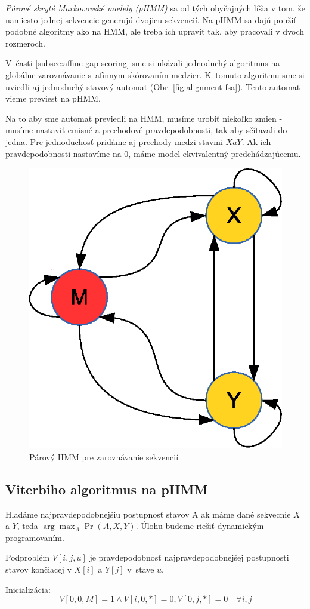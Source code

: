 \textit{Párové skryté Markovovské modely (pHMM)} sa od tých obyčajných líšia v tom, že namiesto jednej sekvencie generujú dvojicu sekvencií. Na pHMM sa dajú použiť podobné algoritmy ako na HMM, ale treba ich upraviť tak, aby pracovali v dvoch rozmeroch.

V~časti \ref{subsec:affine-gap-scoring} sme si ukázali jednoduchý algoritmus na globálne zarovnávanie s~afínnym skórovaním medzier. K~tomuto algoritmu sme si uviedli aj jednoduchý stavový automat (Obr. \ref{fig:alignment-fsa}). Tento automat vieme previesť na pHMM.

Na to aby sme automat previedli na HMM, musíme urobiť niekoľko zmien - musíme nastaviť emisné a prechodové pravdepodobnosti, tak aby sčítavali do jedna. Pre jednoduchosť pridáme aj prechody medzi stavmi $X a Y$. Ak ich pravdepodobnosti nastavíme na 0, máme model ekvivalentný predchádzajúcemu. \cite{durbin}

\begin{figure}[htp]
    \centering
    \includegraphics[width=.4\textwidth]{images/simple_model}
    \caption{Párový HMM pre zarovnávanie sekvencií}
    \label{fig:simple-model}
\end{figure}

\subsection{Viterbiho algoritmus na pHMM}
Hľadáme najpravdepodobnejšiu postupnosť stavov A ak máme dané sekvecnie $X$ a $Y$, teda $\arg\max_A \Pr(A, X, Y)$. Úlohu budeme riešiť dynamickým programovaním.

Podproblém $V[i, j, u]$ je pravdepodobnosť najpravdepodobnejšej postupnosti stavov končiacej v $X[i]$ a $Y[j]$ v~stave $u$.

Inicializácia:
\begin{equation}
\label{eq:viterbi-init}
V[0,0,M] = 1 \wedge V[i,0,*] = 0, V[0,j,*] = 0\quad \forall i, j
\end{equation}

